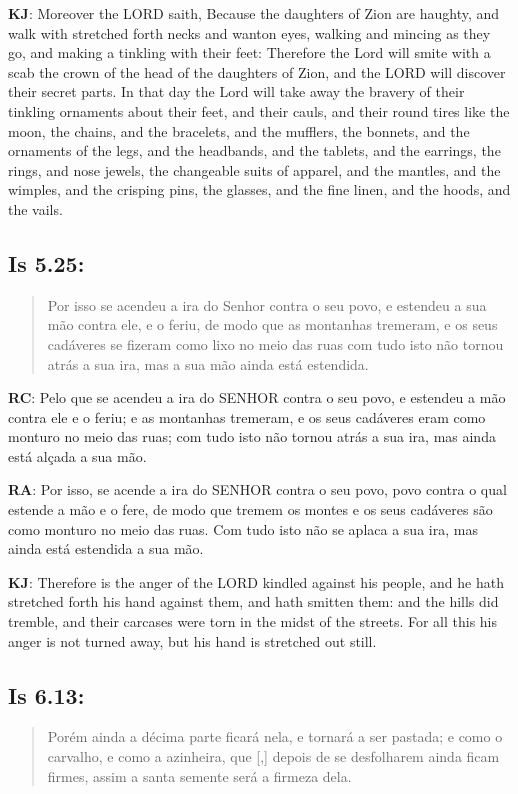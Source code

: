 \textbf{KJ}: Moreover the LORD saith, Because the daughters of Zion are haughty, and walk with stretched forth necks and wanton eyes, walking and mincing as they go, and making a tinkling with their feet: Therefore the Lord will smite with a scab the crown of the head of the daughters of Zion, and the LORD will discover their secret parts. In that day the Lord will take away the bravery of their tinkling ornaments about their feet, and their cauls, and their round tires like the moon, the chains, and the bracelets, and the mufflers, the bonnets, and the ornaments of the legs, and the headbands, and the tablets, and the earrings, the rings, and nose jewels, the changeable suits of apparel, and the mantles, and the wimples, and the crisping pins, the glasses, and the fine linen, and the hoods, and the vails.

\subsection*{Is 5.25:} 
 \begin{quote}
  \small
 Por isso se acendeu a ira do Senhor contra o seu povo, e estendeu a sua mão contra ele, e o feriu, de modo que as montanhas tremeram, e os seus cadáveres se fizeram como lixo no meio das ruas\uwave{;} com tudo isto não tornou atrás a sua ira, mas a sua mão ainda está estendida.
\end{quote}

\textbf{RC}: Pelo que se acendeu a ira do SENHOR contra o seu povo, e estendeu a mão contra ele e o feriu; e as montanhas tremeram, e os seus cadáveres eram como monturo no meio das ruas; com tudo isto não tornou atrás a sua ira, mas ainda está alçada a sua mão.

\textbf{RA}: Por isso, se acende a ira do SENHOR contra o seu povo, povo contra o qual estende a mão e o fere, de modo que tremem os montes e os seus cadáveres são como monturo no meio das ruas. Com tudo isto não se aplaca a sua ira, mas ainda está estendida a sua mão.

\textbf{KJ}: Therefore is the anger of the LORD kindled against his people, and he hath stretched forth his hand against them, and hath smitten them: and the hills did tremble, and their carcases were torn in the midst of the streets. For all this his anger is not turned away, but his hand is stretched out still.

\subsection*{Is 6.13:} 
 \begin{quote}
  \small
 Porém ainda a décima parte ficará nela, e tornará a ser pastada; e como o carvalho, e como a azinheira, que [,] depois de se desfolharem\uwave{,} ainda ficam firmes, assim a santa semente será a firmeza dela.
\end{quote}

